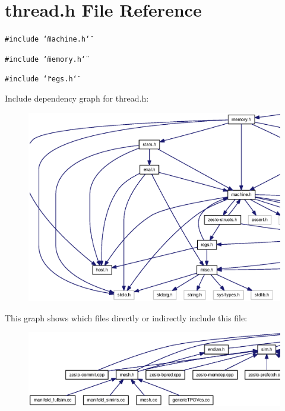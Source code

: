 \section{thread.h File Reference}
\label{thread_8h}
{\tt \#include \char`\"{}machine.h\char`\"{}}\par
{\tt \#include \char`\"{}memory.h\char`\"{}}\par
{\tt \#include \char`\"{}regs.h\char`\"{}}\par


Include dependency graph for thread.h:\nopagebreak
\begin{figure}[H]
\begin{center}
\leavevmode
\includegraphics[width=420pt]{thread_8h__incl}
\end{center}
\end{figure}


This graph shows which files directly or indirectly include this file:\nopagebreak
\begin{figure}[H]
\begin{center}
\leavevmode
\includegraphics[width=420pt]{thread_8h__dep__incl}
\end{center}
\end{figure}
